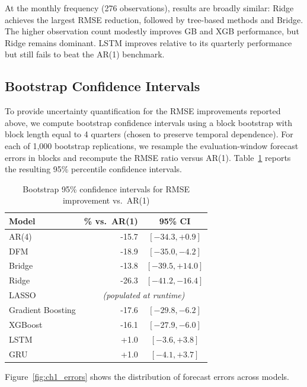 At the monthly frequency (276 observations), results are broadly similar: Ridge achieves the largest RMSE reduction, followed by tree-based methods and Bridge.  The higher observation count modestly improves GB and XGB performance, but Ridge remains dominant.  LSTM improves relative to its quarterly performance but still fails to beat the AR(1) benchmark.

\subsection{Bootstrap Confidence Intervals}

To provide uncertainty quantification for the RMSE improvements reported above, we compute bootstrap confidence intervals using a block bootstrap \citep{kunsch1989jackknife} with block length equal to 4 quarters (chosen to preserve temporal dependence).  For each of 1{,}000 bootstrap replications, we resample the evaluation-window forecast errors in blocks and recompute the RMSE ratio versus AR(1).  Table~\ref{tab:ch1_bootstrap} reports the resulting 95\% percentile confidence intervals.

\begin{table}[htbp]
\centering
\caption{Bootstrap 95\% confidence intervals for RMSE improvement vs.\ AR(1)}
\label{tab:ch1_bootstrap}
\begin{tabular}{@{} l r c @{}}
\toprule
{Model} & {\% vs.\ AR(1)} & {95\% CI} \\
\midrule
AR(4)              & -15.7 & $[-34.3, +0.9]$ \\
DFM                & -18.9 & $[-35.0, -4.2]$ \\
Bridge             & -13.8 & $[-39.5, +14.0]$ \\
Ridge              & -26.3 & $[-41.2, -16.4]$ \\
LASSO              & \multicolumn{2}{c}{\emph{(populated at runtime)}} \\
Gradient Boosting  & -17.6 & $[-29.8, -6.2]$ \\
XGBoost            & -16.1 & $[-27.9, -6.0]$ \\
LSTM               &  +1.0 & $[-3.6, +3.8]$ \\
GRU                &  +1.0 & $[-4.1, +3.7]$ \\
\bottomrule
\end{tabular}
\end{table}

Figure~\ref{fig:ch1_errors} shows the distribution of forecast errors across models.

